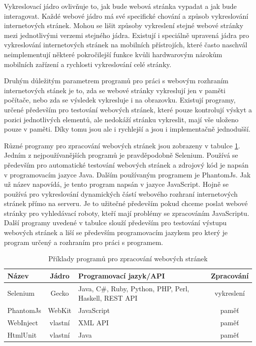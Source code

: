 \documentclass[thesis=M,czech]{FITthesis}[2013/05/10]
\begin{document}
Vykreslovací jádro ovlivňuje to, jak bude webová stránka vypadat a jak bude interagovat. Každé webové jádro má své specifické chování a způsob vykreslování internetových stránek. Mohou se lišit způsoby vykreslení stejné webové stránky mezi jednotlivými verzemi stejného jádra. Existují i speciálně upravená jádra pro vykreslování internetových stránek na mobilních přístrojích, které často naschvál neimplementují některé pokročilejší funkce kvůli hardwarovým nárokům mobilních zařízení a rychlosti vykreslování celé stránky.

Druhým důležitým parametrem programů pro práci s webovým rozhraním internetových stánek je to, zda se webové stránky vykreslují jen v paměti počítače, nebo zda se výsledek vykresluje i na obrazovku. Existují programy, určené především pro testování webových stránek, které pouze kontrolují výskyt a pozici jednotlivých elementů, ale nedokáží stránku vykreslit, mají vše uloženo pouze v paměti. Díky tomu jsou ale i rychlejší a jsou i implementačně jednodušší. 

Různé programy pro zpracování webových stránek jsou zobrazeny v tabulce \ref{tab:web-engines}. Jedním z nejpoužívanějších programů je pravděpodobně Selenium. Používá se především pro automatické testování webových stránek a zdrojový kód je napsán v programovacím jazyce Java. Dalším používaným programem je PhantomJs. Jak už název napovídá, je tento program napsán v jazyce JavaScript. Hojně se používá pro vykreslování dynamických částí webového rozhraní internetových stránek přímo na serveru. Je to užitečné především pokud chceme poslat webové stránky pro vyhledávací roboty, kteří mají problémy se zpracováním JavaScriptu. Další programy uvedené v tabulce slouží především pro testování výstupu webových stránek a liší se především programovacím jazykem pro který je program určený a rozhraním pro práci s programem.

\begin{table}[h]
\centering
\caption{Příklady programů pro zpracování webových stránek}\label{tab:web-engines}
\begin{tabular}{| l | c | p{5cm} | c |}
	\hline
	\textbf{Název} & 
	\textbf{Jádro} & 
	\textbf{Programovací jazyk/API} & 
	\textbf{Zpracování} \\ \hline
	
	Selenium & %
	Gecko & 
	Java, C\#, Ruby, Python, PHP, Perl, Haskell, REST API & 
	vykreslení \\ \hline
	
	PhantomJs & %
	WebKit & 
	JavaScript & 
	paměť \\ \hline
	
	WebInject & %
	vlastní &
	XML API &
	paměť \\ \hline
	
	HtmlUnit & %
	vlastní &
	Java &
	paměť \\ \hline
		
\end{tabular}
\end{table}
\end{document}
